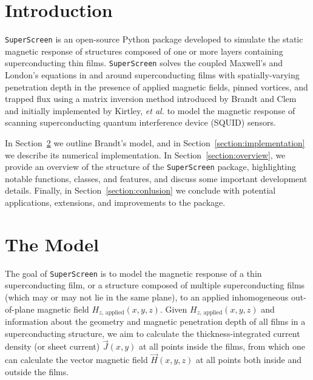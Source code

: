 \documentclass[final,3p,times]{elsarticle}
\newcommand{\inline}[1]{\texttt{#1}\xspace}
\newcommand{\SuperScreen}{\inline{SuperScreen}}
\begin{document}
\begin{small}
\end{small}


\section{Introduction}
\label{section:introduction}

\SuperScreen is an open-source Python package developed to simulate the static magnetic response of structures composed of one or more layers containing superconducting thin films. \SuperScreen solves the coupled Maxwell's and London's equations in and around superconducting films with spatially-varying penetration depth in the presence of applied magnetic fields, pinned vortices, and trapped flux using a matrix inversion method introduced by Brandt and Clem~\cite{Brandt_Clem_2004,brandt_thin_2005} and initially implemented by Kirtley, \emph{et al.} to model the magnetic response of scanning superconducting quantum interference device (SQUID) sensors.~\cite{kirtley_scanning_2016, kirtley_response_2016}

In Section~\ref{section:model} we outline Brandt's model, and in Section~\ref{section:implementation} we describe its numerical implementation. In Section~\ref{section:overview}, we provide an overview of the structure of the \SuperScreen package, highlighting notable functions, classes, and features, and discuss some important development details. Finally, in Section~\ref{section:conlusion} we conclude with potential applications, extensions, and improvements to the package.

\section{The Model}
\label{section:model}

The goal of \SuperScreen is to model the magnetic response of a thin superconducting film, or a structure composed of multiple superconducting films (which may or may not lie in the same plane), to an applied inhomogeneous out-of-plane magnetic field
$H_{z,\,\mathrm{applied}}(x, y, z)$. Given $H_{z,\,\mathrm{applied}}(x, y, z)$ and information about the geometry and magnetic penetration depth of all films in a superconducting structure, we aim to calculate the thickness-integrated current density (or sheet current) $\vec{J}(x, y)$ at all points inside the films, from which one can calculate the vector magnetic field $\vec{H}(x, y, z)$ at all points both inside and outside the films.
\end{document}
